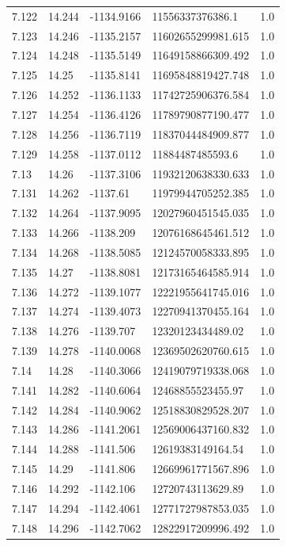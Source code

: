 \begin{tabular}{lllll}
7.122 & 14.244 & -1134.9166 & 11556337376386.1 & 1.0 \\
7.123 & 14.246 & -1135.2157 & 11602655299981.615 & 1.0 \\
7.124 & 14.248 & -1135.5149 & 11649158866309.492 & 1.0 \\
7.125 & 14.25 & -1135.8141 & 11695848819427.748 & 1.0 \\
7.126 & 14.252 & -1136.1133 & 11742725906376.584 & 1.0 \\
7.127 & 14.254 & -1136.4126 & 11789790877190.477 & 1.0 \\
7.128 & 14.256 & -1136.7119 & 11837044484909.877 & 1.0 \\
7.129 & 14.258 & -1137.0112 & 11884487485593.6 & 1.0 \\
7.13 & 14.26 & -1137.3106 & 11932120638330.633 & 1.0 \\
7.131 & 14.262 & -1137.61 & 11979944705252.385 & 1.0 \\
7.132 & 14.264 & -1137.9095 & 12027960451545.035 & 1.0 \\
7.133 & 14.266 & -1138.209 & 12076168645461.512 & 1.0 \\
7.134 & 14.268 & -1138.5085 & 12124570058333.895 & 1.0 \\
7.135 & 14.27 & -1138.8081 & 12173165464585.914 & 1.0 \\
7.136 & 14.272 & -1139.1077 & 12221955641745.016 & 1.0 \\
7.137 & 14.274 & -1139.4073 & 12270941370455.164 & 1.0 \\
7.138 & 14.276 & -1139.707 & 12320123434489.02 & 1.0 \\
7.139 & 14.278 & -1140.0068 & 12369502620760.615 & 1.0 \\
7.14 & 14.28 & -1140.3066 & 12419079719338.068 & 1.0 \\
7.141 & 14.282 & -1140.6064 & 12468855523455.97 & 1.0 \\
7.142 & 14.284 & -1140.9062 & 12518830829528.207 & 1.0 \\
7.143 & 14.286 & -1141.2061 & 12569006437160.832 & 1.0 \\
7.144 & 14.288 & -1141.506 & 12619383149164.54 & 1.0 \\
7.145 & 14.29 & -1141.806 & 12669961771567.896 & 1.0 \\
7.146 & 14.292 & -1142.106 & 12720743113629.89 & 1.0 \\
7.147 & 14.294 & -1142.4061 & 12771727987853.035 & 1.0 \\
7.148 & 14.296 & -1142.7062 & 12822917209996.492 & 1.0 \\

\end{tabular}
